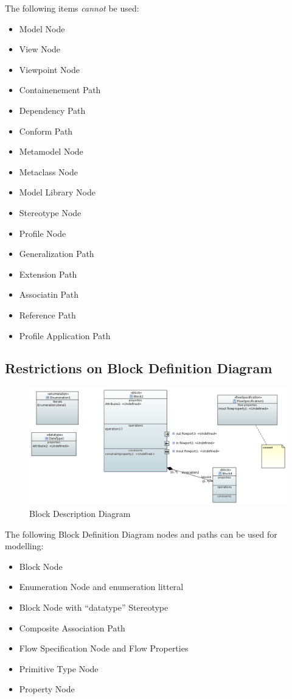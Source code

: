The following items \emph{cannot} be used:
\begin{itemize}
\item Model Node
\item View Node
\item Viewpoint Node
\item Containenement Path
\item Dependency Path
\item Conform Path
\item Metamodel Node
\item Metaclass Node
\item Model Library Node
\item Stereotype Node
\item Profile Node
\item Generalization Path
\item Extension Path
\item Associatin Path
\item Reference Path
\item Profile Application Path
\end{itemize}

\subsection{Restrictions on Block Definition Diagram}



\begin{figure}[ht]
  \centering
  \includegraphics[width=\textwidth]{images/BDDDiagram.PNG}
  \caption{Block Description Diagram}
  \label{fig:Bdd}
\end{figure}



The following Block Definition Diagram nodes and paths can be used for
modelling:
\begin{itemize}
\item Block Node 
\item Enumeration Node  and enumeration litteral
\item Block Node with ``datatype'' Stereotype 
\item Composite Association Path 
\item Flow Specification Node  and
  Flow Properties
\item Primitive Type Node
\item Property Node
\end{itemize}

